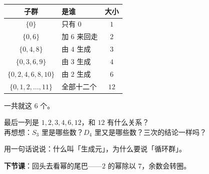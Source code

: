 \begin{example}[模 \(12\) 加法里的全部子群]
  \begin{center}
  \begin{tabular}{@{}clc@{}}
    \toprule
    子群 & 是谁 & 大小 \\
    \midrule
    \(\{0\}\) & 只有 \(0\) & \(1\) \\
    \(\{0,6\}\) & 加 \(6\) 来回走 & \(2\) \\
    \(\{0,4,8\}\) & 由 \(4\) 生成 & \(3\) \\
    \(\{0,3,6,9\}\) & 由 \(3\) 生成 & \(4\) \\
    \(\{0,2,4,6,8,10\}\) & 由 \(2\) 生成 & \(6\) \\
    \(\{0,1,2,\dots,11\}\) & 全部十二个 & \(12\) \\
    \bottomrule
  \end{tabular}
  \end{center}
  一共就这 \(6\) 个。
\end{example}

\begin{sikao}
  最后一列是 \(1,2,3,4,6,12\)，和 \(12\) 有什么关系？\\[4pt]
  再想想：\(S_3\) 里是哪些数？\(D_4\) 里又是哪些数？三次的结论一样吗？
\end{sikao}

\begin{xiaojie}
  用一句话说说：什么叫「生成元」，为什么要说「循环群」。
\end{xiaojie}

\noindent\textbf{下节课}：回头去看幂的尾巴——\(2\) 的幂除以 \(7\)，余数会转圈。